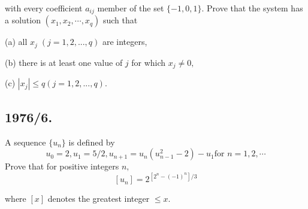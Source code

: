 \documentclass[12pt,thmsa]{article}
\begin{document}
with every coefficient $a_{ij}$ member of the set $\{-1,0,1\}.$ Prove that
the system has a solution $(x_{1},x_{2},\cdots ,x_{q})$ such that

(a) all $x_{j}\;(j=1,2,...,q)$ are integers, 

(b) there is at least one value of $j$ for which $x_{j}\neq 0,$

(c) $\left| x_{j}\right| \leq q(j=1,2,...,q).$

\subsection{1976/6. }

A sequence $\{u_{n}\}$ is defined by
\[
u_{0}=2,u_{1}=5/2,u_{n+1}=u_{n}(u_{n-1}^{2}-2)-u_{1}\text{for }n=1,2,\cdots 
\]
Prove that for positive integers $n,$%
\[
\left[ u_{n}\right] =2^{\left[ 2^{n}-(-1)^{n}\right] /3}
\]

where $[x]$ denotes the greatest integer $\leq x.$
\end{document}
